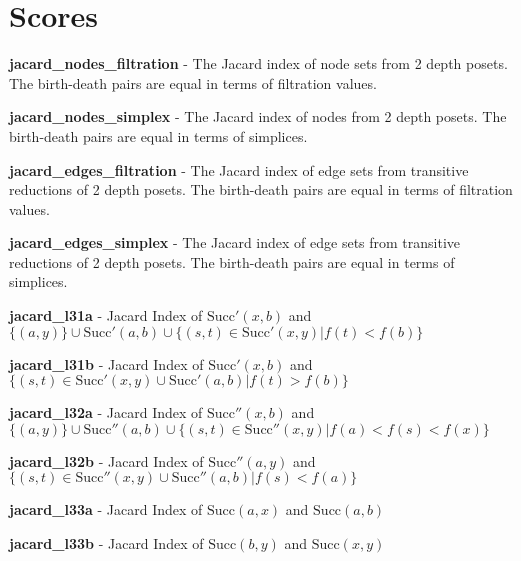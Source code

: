 \documentclass{article}
\begin{document}
\section{Scores}

\par \textbf{jacard\_nodes\_filtration} -
The Jacard index of node sets from 2 depth posets.
The birth-death pairs are equal in terms of filtration values.


\par \textbf{jacard\_nodes\_simplex} -
The Jacard index of nodes from 2 depth posets.
The birth-death pairs are equal in terms of simplices.


\par \textbf{jacard\_edges\_filtration} -
The Jacard index of edge sets from transitive reductions of 2 depth posets.
The birth-death pairs are equal in terms of filtration values.


\par \textbf{jacard\_edges\_simplex} -
The Jacard index of edge sets from transitive reductions of 2 depth posets.
The birth-death pairs are equal in terms of simplices.


\par \textbf{jacard\_l31a} -
Jacard Index of $\text{Succ}'(x, b)$ and $\{(a, y)\} \cup \text{Succ}'(a, b) \cup \{(s, t)\in \text{Succ}'(x, y) | f(t) < f(b)\}$


\par \textbf{jacard\_l31b} -
Jacard Index of $\text{Succ}'(x, b)$ and $\{(s, t)\in \text{Succ}'(x, y) \cup \text{Succ}'(a, b) | f(t) > f(b)\}$


\par \textbf{jacard\_l32a} -
Jacard Index of $\text{Succ}''(x, b)$ and $\{(a, y)\} \cup \text{Succ}''(a, b) \cup \{(s, t)\in \text{Succ}''(x, y) | f(a) < f(s) < f(x)\}$


\par \textbf{jacard\_l32b} -
Jacard Index of $\text{Succ}''(a, y)$ and $\{(s, t)\in \text{Succ}''(x, y) \cup \text{Succ}''(a, b) | f(s) < f(a)\}$


\par \textbf{jacard\_l33a} -
Jacard Index of $\text{Succ}(a, x)$ and $\text{Succ}(a, b)$


\par \textbf{jacard\_l33b} -
Jacard Index of $\text{Succ}(b, y)$ and $\text{Succ}(x, y)$
\end{document}
